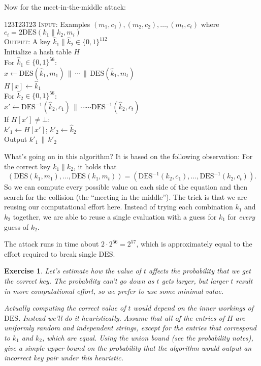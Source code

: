 \documentclass[11pt]{article}
\newtheorem{exercise}{Exercise}
\newcommand{\concat}{{\,\|\,}}
\newcommand{\bits}{\{0,1\}}
\newcommand{\des}{\mathrm{DES}}
\newcommand{\twodes}{\mathrm{2DES}}
\begin{document}
Now for the meet-in-the-middle attack:
\begin{tabbing}123\=123\=123\=\kill
    \> \textsc{Input}: Examples $(m_1,c_1),(m_2,c_2),\ldots,(m_t,c_t)$ where
    $c_i=\twodes(k_1\|k_2,m_i)$\\
    \> \textsc{Output}: A key $\hat{k}_1\|\hat{k}_2\in\bits^{112}$\\
    \> Initialize a hash table $H$\\
    \> For $\hat{k}_1\in\bits^{56}$:\\
    \> \> $x \gets \des(\hat{k}_1,m_1)\concat \cdots \concat \des(\hat{k}_1,m_t)$\\
    \> \> $H[x] \gets \hat{k}_1$\\
    \> For $\hat{k}_2\in\bits^{56}$:\\
    \> \> $x' \gets \des^{-1}(\hat{k}_2,c_1)\concat 
           \cdots\cdots \des^{-1}(\hat{k}_2,c_t)$\\
    \> \> If $H[x'] \neq \bot$:\\
    \> \> \> $k'_1 \gets H[x']$; $k'_2 \gets \hat{k}_2$\\
    \> \> \> Output $k'_1\concat k'_2$
\end{tabbing}
What's going on in this algorithm? It is based on the following observation:
For the correct key $k_1\|k_2$, it holds that
\[
    (\des(k_1,m_1),\ldots,\des(k_1,m_t)) = 
    (\des^{-1}(k_2,c_1),\ldots,\des^{-1}(k_2,c_t)).
\]
So we can compute every possible value on each side of the equation and then
search for the collision (the ``meeting in the middle''). The trick is that
we are reusing our computational effort here. Instead of trying each
combination $k_1$ and $k_2$ together, we are able to reuse a single
evaluation with a guess for $k_1$ for \emph{every} guess of $k_2$.

The attack runs in time about $2\cdot 2^{56}=2^{57}$, which is approximately
equal to the effort required to break single $\des$.

\begin{exercise}\label{ex:examples}
    Let's estimate how the value of $t$ affects the probability that
    we get the correct key. The probability can't go down as $t$
    gets larger, but larger $t$ result in more computational effort,
    so we prefer to use some minimal value.

    Actually computing the correct value of $t$ would depend on the
    inner workings of $\des$. Instead we'll do it heuristically.
    Assume that all of the entries of $H$ are \emph{uniformly
    random and independent strings}, except for the entries that
    correspond to $k_1$ and $k_2$, which are equal. Using the union bound
    (see the probability notes), give a simple upper bound on the
    probability that the algorithm would output an incorrect key pair
    under this heuristic.
\end{exercise}
\end{document}
